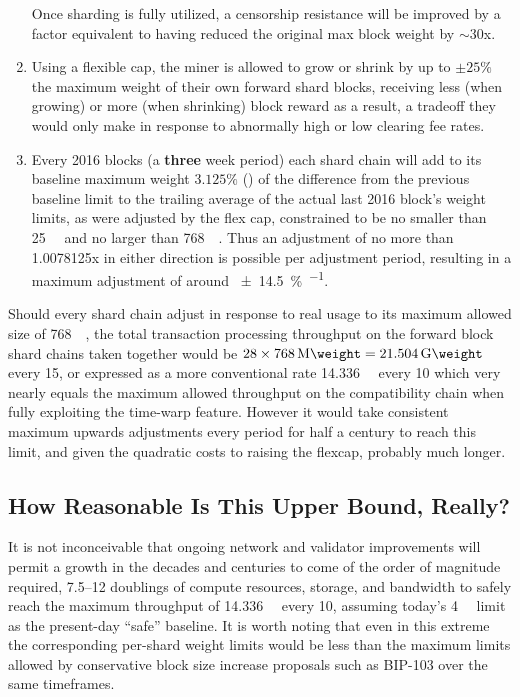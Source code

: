\begin{enumerate}
Once sharding is fully utilized, a censorship resistance will be
improved by a factor equivalent to having reduced the original max
block weight by $\sim 30$x.


  \item

    Using a flexible cap, the miner is allowed to grow or shrink by up
    to $\pm 25\%$ the maximum weight of their own forward shard
    blocks, receiving less (when growing) or more (when shrinking)
    block reward as a result, a tradeoff they would only make in
    response to abnormally high or low clearing fee rates.

  \item

    Every \num{2016} blocks (a \textbf{three} week period) each shard
    chain will add to its baseline maximum weight $3.125\%$
    () of the difference from the previous baseline limit
    to the trailing average of the actual last \num{2016} block's
    weight limits, as were adjusted by the flex cap, constrained to be
    no smaller than \SI{25}{\kilo\weight} and no larger than
    \SI{768}{\mega\weight}.  Thus an adjustment of no more than
    \num{1.0078125}x in either direction is possible per adjustment
    period, resulting in a maximum adjustment of around
    \SI[per-mode=symbol]{\pm 14.5}{\percent\per\year}.

\end{enumerate}

Should every shard chain adjust in response to real usage to its
maximum allowed size of \SI{768}{\mega\weight}, the total transaction
processing throughput on the forward block shard chains taken together
would be $28 \times \SI{768}{\mega\weight}=\SI{21.504}{\giga\weight}$
every \SI{15}{\min}, or expressed as a more conventional rate
\SI{14.336}{\giga\weight} every \SI{10}{\min} which very nearly equals
the maximum allowed throughput on the compatibility chain when fully
exploiting the time-warp feature.  However it would take consistent
maximum upwards adjustments every period for half a century to reach
this limit, and given the quadratic costs to raising the flexcap,
probably much longer.

\subsection{How Reasonable Is This Upper Bound, Really?}

It is not inconceivable that ongoing network and validator
improvements will permit a growth in the decades and centuries to come
of the order of magnitude required, \numrange{7.5}{12} doublings of
compute resources, storage, and bandwidth to safely reach the maximum
throughput of \SI{14.336}{\giga\weight} every \SI{10}{\min}, assuming
today's \SI{4}{\mega\weight} limit as the present-day ``safe''
baseline.  It is worth noting that even in this extreme the
corresponding per-shard weight limits would be less than the maximum
limits allowed by conservative block size increase proposals such as
BIP-103 over the same timeframes.

